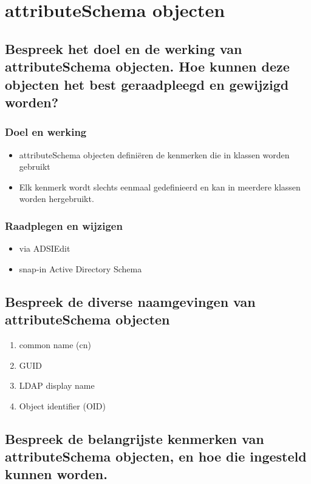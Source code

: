 \chapter{attributeSchema objecten}

\section{Bespreek het doel en de werking van attributeSchema objecten. Hoe
kunnen deze objecten het best geraadpleegd en gewijzigd worden?}

\subsection{Doel en werking}

\begin{itemize}
	\item attributeSchema objecten definiëren de kenmerken die in klassen
		worden gebruikt
	\item Elk kenmerk wordt slechts eenmaal gedefinieerd en kan in meerdere
		klassen worden hergebruikt.
\end{itemize}

\subsection{Raadplegen en wijzigen}

\begin{itemize}
	\item via ADSIEdit
	\item snap-in Active Directory Schema
\end{itemize}

\section{Bespreek de diverse naamgevingen van attributeSchema objecten}

\begin{enumerate}
	\item common name (cn)
	\item GUID
	\item LDAP display name
	\item Object identifier (OID)
\end{enumerate}

\section{Bespreek de belangrijste kenmerken van attributeSchema objecten, en hoe
die ingesteld kunnen worden.}

